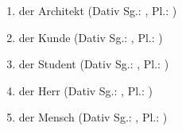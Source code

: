 \begin{enumerate}[label=\textbf{Aufgabe \arabic*}.]
    \item der Architekt (Dativ Sg.: \underline{\hspace{1cm}}, Pl.: \underline{\hspace{1cm}})
    \item der Kunde (Dativ Sg.: \underline{\hspace{1cm}}, Pl.: \underline{\hspace{1cm}})
    \item der Student (Dativ Sg.: \underline{\hspace{1cm}}, Pl.: \underline{\hspace{1cm}})
    \item der Herr (Dativ Sg.: \underline{\hspace{1cm}}, Pl.: \underline{\hspace{1cm}})
    \item der Mensch (Dativ Sg.: \underline{\hspace{1cm}}, Pl.: \underline{\hspace{1cm}})
\end{enumerate}

\chapterend
